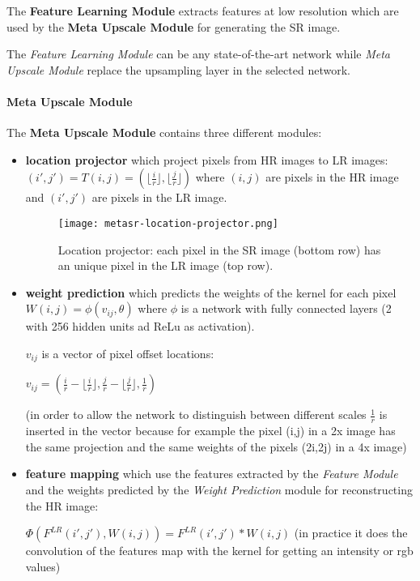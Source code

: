 The \textbf{Feature Learning Module} extracts features at low resolution which are used by the \textbf{Meta Upscale Module} for generating the SR image.

The \textit{Feature Learning Module} can be any state-of-the-art network while \textit{Meta Upscale Module} replace the upsampling layer in the selected network.

\paragraph{Meta Upscale Module}

The \textbf{Meta Upscale Module} contains three different modules:
\begin{itemize}
    \item \textbf{location projector} which project pixels from HR images to LR images: $(i',j') = T(i,j) = (\lfloor\frac{i}{r}\rfloor,\lfloor\frac{j}{r}\rfloor)$ where $(i,j)$ are pixels in the HR image and $(i',j')$ are pixels in the LR image.
    \begin{figure}[h]
        \centering
        \texttt{[image: metasr-location-projector.png]}
        \caption{Location projector: each pixel in the SR image (bottom row) has an unique pixel in the LR image (top row).}
    \end{figure}

    \item \textbf{weight prediction} which predicts the weights of the kernel for each pixel $W(i,j)=\phi(v_{ij},\theta)$ where $\phi$ is a network with fully connected layers (2 with 256 hidden units ad ReLu as activation).
    
    $v_{ij}$ is a vector of pixel offset locations:
    
    $v_{ij} = (\frac{i}{r}-\lfloor\frac{i}{r}\rfloor, \frac{j}{r}-\lfloor\frac{j}{r}\rfloor, \frac{1}{r})$

    (in order to allow the network to distinguish between different scales $\frac{1}{r}$ is inserted in the vector because for example the pixel (i,j) in a 2x image has the same projection and the same weights of the pixels (2i,2j) in a 4x image)
    
    \item \textbf{feature mapping} which use the features extracted by the \textit{Feature Module} and the weights predicted by the \textit{Weight Prediction} module for reconstructing the HR image:
    
    $\Phi(F^{LR}(i',j'), W(i,j)) = F^{LR}(i',j') \ast W(i,j)$ (in practice it does the convolution of the features map with the kernel for getting an intensity or rgb values)
\end{itemize}



